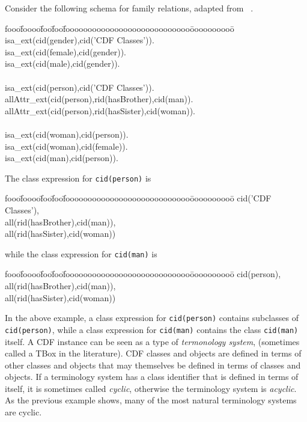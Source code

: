\begin{example} \rm 
Consider the following schema for family relations, adapted from
~\cite{BaNu03}.
%
{\tt {\small
\begin{tabbing}
fooo\=foooo\=foo\=foo\=foooooooooooooooooooooooooooo\=oooooooooo\=\kill
\> isa\_ext(cid(gender),cid('CDF Classes')). \\
\>   isa\_ext(cid(female),cid(gender)). \\
\>   isa\_ext(cid(male),cid(gender)). \\
\\
\> isa\_ext(cid(person),cid('CDF Classes')). \\
\> \> allAttr\_ext(cid(person),rid(hasBrother),cid(man)). \\
\> \> allAttr\_ext(cid(person),rid(hasSister),cid(woman)). \\
\\
\>   isa\_ext(cid(woman),cid(person)). \\
\> \>   isa\_ext(cid(woman),cid(female)). \\
\>   isa\_ext(cid(man),cid(person)). \\
%
\end{tabbing}
} }
The class expression for {\tt cid(person)} is
{\em {\small
\begin{tabbing}
fooo\=foooo\=foo\=foo\=foooooooooooooooooooooooooooo\=oooooooooo\=\kill
\> cid('CDF Classes'), \\
\> all(rid(hasBrother),cid(man)), \\
\> all(rid(hasSister),cid(woman))
\end{tabbing}
} }
while the class expression for {\tt cid(man)} is 
{\em {\small
\begin{tabbing}
fooo\=foooo\=foo\=foo\=foooooooooooooooooooooooooooo\=oooooooooo\=\kill
\> cid(person), \\
\> all(rid(hasBrother),cid(man)), \\
\> all(rid(hasSister),cid(woman))
\end{tabbing}
} }
\end{example}
In the above example, a class expression for {\tt cid(person)}
contains subclasses of {\tt cid(person)}, while a class expression for
{\tt cid(man)} contains the class {\tt cid(man)} itself.  A CDF
instance can be seen as a type of {\em termonology system}, (sometimes
called a TBox in the literature).  CDF classes and objects are defined
in terms of other classes and objects that may themselves be defined
in terms of classes and objects.  If a terminology system has a class
identifier that is defined in terms of itself, it is sometimes called
{\em cyclic}, otherwise the terminology system is {\em acyclic}.  As
the previous example shows, many of the most natural terminology
systems are cyclic.

